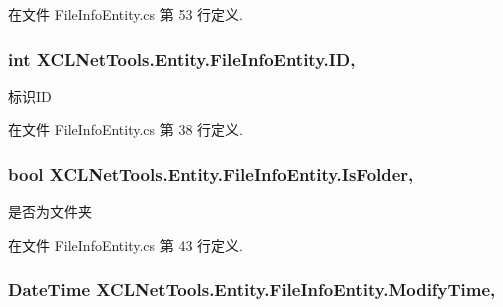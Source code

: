 在文件 File\-Info\-Entity.\-cs 第 53 行定义.

\hypertarget{class_x_c_l_net_tools_1_1_entity_1_1_file_info_entity_a150f26081f12badeea9a2255bbea6faf}{
\subsubsection[{I\-D}]{\setlength{\rightskip}{0pt plus 5cm}int X\-C\-L\-Net\-Tools.\-Entity.\-File\-Info\-Entity.\-I\-D\hspace{0.3cm}{\ttfamily [get]}, {\ttfamily [set]}}}\label{class_x_c_l_net_tools_1_1_entity_1_1_file_info_entity_a150f26081f12badeea9a2255bbea6faf}


标识\-I\-D 



在文件 File\-Info\-Entity.\-cs 第 38 行定义.

\hypertarget{class_x_c_l_net_tools_1_1_entity_1_1_file_info_entity_ad945716535742c01f83dffc2766c0987}{
\subsubsection[{Is\-Folder}]{\setlength{\rightskip}{0pt plus 5cm}bool X\-C\-L\-Net\-Tools.\-Entity.\-File\-Info\-Entity.\-Is\-Folder\hspace{0.3cm}{\ttfamily [get]}, {\ttfamily [set]}}}\label{class_x_c_l_net_tools_1_1_entity_1_1_file_info_entity_ad945716535742c01f83dffc2766c0987}


是否为文件夹 



在文件 File\-Info\-Entity.\-cs 第 43 行定义.

\hypertarget{class_x_c_l_net_tools_1_1_entity_1_1_file_info_entity_a64c6633bec7e4d547632c122dbaad9f8}{
\subsubsection[{Modify\-Time}]{\setlength{\rightskip}{0pt plus 5cm}Date\-Time X\-C\-L\-Net\-Tools.\-Entity.\-File\-Info\-Entity.\-Modify\-Time\hspace{0.3cm}{\ttfamily [get]}, {\ttfamily [set]}}}\label{class_x_c_l_net_tools_1_1_entity_1_1_file_info_entity_a64c6633bec7e4d547632c122dbaad9f8}


